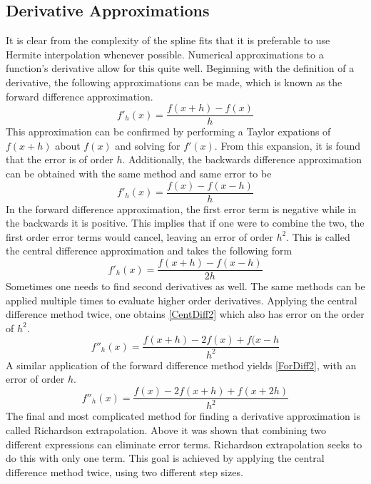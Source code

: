 \documentclass[12pt]{article}
\begin{document}
\subsection{Derivative Approximations}
It is clear from the complexity of the spline fits that it is preferable to use Hermite interpolation whenever possible.  Numerical approximations to a function's derivative allow for this quite well.  Beginning with the definition of a derivative, the following approximations can be made, which is known as the forward difference approximation.
\begin{equation}
\label{ForDiff}
f'_h(x)=\frac{f(x+h)-f(x)}{h}
\end{equation}
This approximation can be confirmed by performing a Taylor expations of $f(x+h)$ about $f(x)$ and solving for $f'(x)$.  From this expansion, it is found that the error is of order $h$.   Additionally, the backwards difference approximation can be obtained with the same method and same error to be
 \begin{equation}
\label{BackDiff}
f'_h(x)=\frac{f(x)-f(x-h)}{h}
\end{equation}
In the forward difference approximation, the first error term is negative while in the backwards it is positive.  This implies that if one were to combine the two, the first order error terms would cancel, leaving an error of order $h^2$.  This is called the central difference approximation and takes the following form
\begin{equation}
\label{CentDiff}
f'_h(x)=\frac{f(x+h)-f(x-h)}{2h}
\end{equation}
Sometimes one needs to find second derivatives as well.  The same methods can be applied multiple times to evaluate higher order derivatives.  Applying the central difference method twice, one obtains \eqref{CentDiff2} which also has error on the order of $h^2$.
\begin{equation}
\label{CentDiff2}
f''_h(x)=\frac{f(x+h)-2f(x)+f(x-h}{h^2}
\end{equation}
A similar application of the forward difference method yields \eqref{ForDiff2}, with an error of order $h$.
\begin{equation}
\label{ForDiff2}
f''_h(x)=\frac{f(x)-2f(x+h)+f(x+2h)}{h^2}
\end{equation}
The final and most complicated method for finding a derivative approximation is called Richardson extrapolation.  Above it was shown that combining two different expressions can eliminate error terms.  Richardson extrapolation seeks to do this with only one term.  This goal is achieved by applying the central difference method twice, using two different step sizes.
\end{document}
